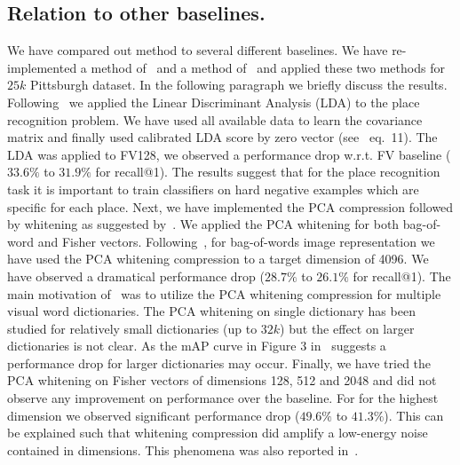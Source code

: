   \subsection{\textcolor{petr}{Relation to other baselines.}}
    \textcolor{petr}{
      We have compared out method to several different baselines. We have re-implemented a method of~\cite{Aubry13} and a method of~\cite{JegouChum12} and applied these two methods for $25k$ Pittsburgh dataset. In the following paragraph we briefly discuss the results.
      \newline
      Following~\cite{Aubry13} we applied the Linear Discriminant Analysis (LDA) to the place recognition problem. We have used all available data to learn the covariance matrix and finally used calibrated LDA score by zero vector (see~\cite{Aubry13} eq.~11). The LDA was applied to FV128, we observed a performance drop w.r.t. FV baseline ($33.6\%$ to $31.9\%$ for recall@1). The results suggest that for the place recognition task it is important to train classifiers on hard negative examples which are specific for each place.
      \newline
      Next, we have implemented the PCA compression followed by whitening as suggested by~\cite{JegouChum12}. We applied the PCA whitening for both bag-of-word and Fisher vectors. Following~\cite{JegouChum12}, for bag-of-words image representation we have used the PCA whitening compression to a target dimension of 4096. We have observed a dramatical performance drop ($28.7\%$ to $26.1\%$ for recall@1). The main motivation of~\cite{JegouChum12} was to utilize the PCA whitening compression for multiple visual word dictionaries. The PCA whitening on single dictionary has been studied for relatively small dictionaries (up to $32k$) but the effect on larger dictionaries is not clear. As the mAP curve in Figure 3 in~\cite{JegouChum12} suggests a performance drop for larger dictionaries may occur.
      \newline
      Finally, we have tried the PCA whitening on Fisher vectors of dimensions 128, 512 and 2048 and did not observe any improvement on performance over the baseline. For for the highest dimension we observed significant performance drop ($49.6\%$ to $41.3\%$). This can be explained such that whitening compression did amplify a low-energy noise contained in dimensions. This phenomena was also reported in~\cite{JegouChum12}.
    }

